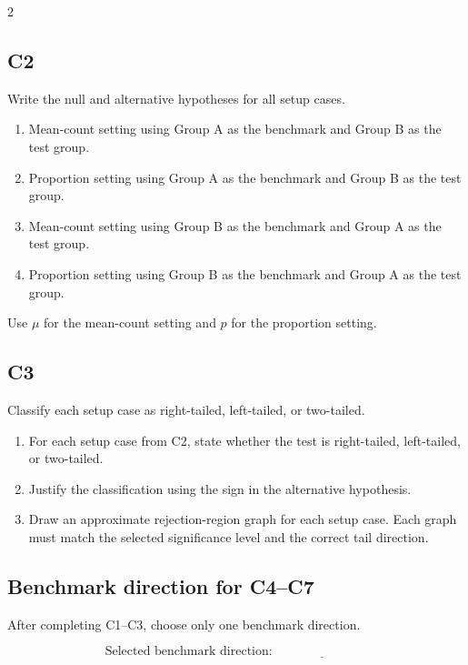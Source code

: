\documentclass[12pt]{article}
\begin{document}
\begin{multicols}{2}
		\subsection*{C2}
		
		Write the null and alternative hypotheses for all setup cases.
		
		\begin{enumerate}
			\item Mean-count setting using Group A as the benchmark and Group B as the test group.
			\item Proportion setting using Group A as the benchmark and Group B as the test group.
			\item Mean-count setting using Group B as the benchmark and Group A as the test group.
			\item Proportion setting using Group B as the benchmark and Group A as the test group.
		\end{enumerate}
		
		Use \(\mu\) for the mean-count setting and \(p\) for the proportion setting.
		
		\subsection*{C3}
		
		Classify each setup case as right-tailed, left-tailed, or two-tailed.
		
		\begin{enumerate}
			\item For each setup case from C2, state whether the test is right-tailed, left-tailed, or two-tailed.
			\item Justify the classification using the sign in the alternative hypothesis.
			\item Draw an approximate rejection-region graph for each setup case. Each graph must match the selected significance level and the correct tail direction.
		\end{enumerate}
		
		\subsection*{Benchmark direction for C4--C7}
		
		After completing C1--C3, choose only one benchmark direction.
		
		\[
		\text{Selected benchmark direction: } \underline{\hspace{3cm}}
		\]
		

\end{multicols}
\end{document}
